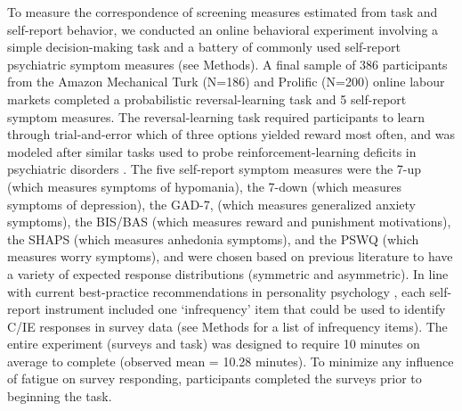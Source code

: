 \documentclass[a4paper,notitlepage,12pt]{article}
\begin{document}

To measure the correspondence of screening measures estimated from task and self-report behavior, we conducted an online behavioral experiment involving a simple decision-making task and a battery of commonly used self-report psychiatric symptom measures (see Methods). A final sample of 386 participants from the Amazon Mechanical Turk (N=186) and Prolific (N=200) online labour markets completed a probabilistic reversal-learning task and 5 self-report symptom measures. The reversal-learning task required participants to learn through trial-and-error which of three options yielded reward most often, and was modeled after similar tasks used to probe reinforcement-learning deficits in psychiatric disorders \cite{waltz2007probabilistic, mukherjee_reward_2020}. The five self-report symptom measures were the 7-up (which measures symptoms of hypomania), the 7-down (which measures symptoms of depression), the GAD-7, (which measures generalized anxiety symptoms), the BIS/BAS (which measures reward and punishment motivations), the SHAPS (which measures anhedonia symptoms), and the PSWQ (which measures worry symptoms), and were chosen based on previous literature to have a variety of expected response distributions (symmetric and asymmetric). In line with current best-practice recommendations in personality psychology \cite{huang2015detecting}, each self-report instrument included one `infrequency' item that could be used to identify C/IE responses in survey data (see Methods for a list of infrequency items). The entire experiment (surveys and task) was designed to require 10 minutes on average to complete (observed mean = 10.28 minutes). To minimize any influence of fatigue on survey responding, participants completed the surveys prior to beginning the task.
\end{document}
